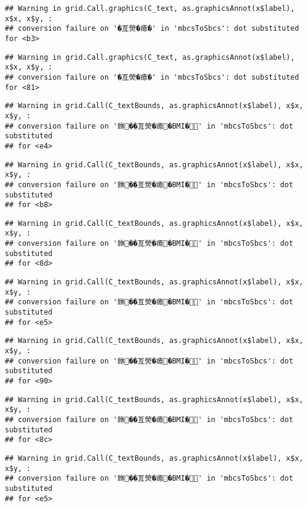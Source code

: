 \documentclass[
]{article}
\begin{document}
\begin{verbatim}
## Warning in grid.Call.graphics(C_text, as.graphicsAnnot(x$label), x$x, x$y, :
## conversion failure on '�亙熒�瘜�' in 'mbcsToSbcs': dot substituted for <b3>
\end{verbatim}

\begin{verbatim}
## Warning in grid.Call.graphics(C_text, as.graphicsAnnot(x$label), x$x, x$y, :
## conversion failure on '�亙熒�瘜�' in 'mbcsToSbcs': dot substituted for <81>
\end{verbatim}

\begin{verbatim}
## Warning in grid.Call(C_textBounds, as.graphicsAnnot(x$label), x$x, x$y, :
## conversion failure on '銝��亙熒�瘜�BMI�' in 'mbcsToSbcs': dot substituted
## for <e4>
\end{verbatim}

\begin{verbatim}
## Warning in grid.Call(C_textBounds, as.graphicsAnnot(x$label), x$x, x$y, :
## conversion failure on '銝��亙熒�瘜�BMI�' in 'mbcsToSbcs': dot substituted
## for <b8>
\end{verbatim}

\begin{verbatim}
## Warning in grid.Call(C_textBounds, as.graphicsAnnot(x$label), x$x, x$y, :
## conversion failure on '銝��亙熒�瘜�BMI�' in 'mbcsToSbcs': dot substituted
## for <8d>
\end{verbatim}

\begin{verbatim}
## Warning in grid.Call(C_textBounds, as.graphicsAnnot(x$label), x$x, x$y, :
## conversion failure on '銝��亙熒�瘜�BMI�' in 'mbcsToSbcs': dot substituted
## for <e5>
\end{verbatim}

\begin{verbatim}
## Warning in grid.Call(C_textBounds, as.graphicsAnnot(x$label), x$x, x$y, :
## conversion failure on '銝��亙熒�瘜�BMI�' in 'mbcsToSbcs': dot substituted
## for <90>
\end{verbatim}

\begin{verbatim}
## Warning in grid.Call(C_textBounds, as.graphicsAnnot(x$label), x$x, x$y, :
## conversion failure on '銝��亙熒�瘜�BMI�' in 'mbcsToSbcs': dot substituted
## for <8c>
\end{verbatim}

\begin{verbatim}
## Warning in grid.Call(C_textBounds, as.graphicsAnnot(x$label), x$x, x$y, :
## conversion failure on '銝��亙熒�瘜�BMI�' in 'mbcsToSbcs': dot substituted
## for <e5>
\end{verbatim}
\end{document}

